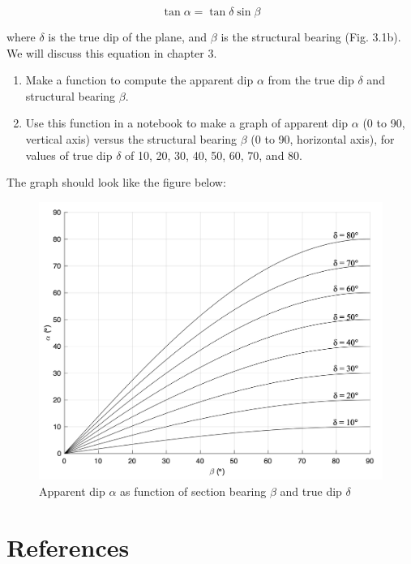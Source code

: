 \documentclass[a4paper , 12pt]{book}
\begin{document}
\begin{enumerate}
    \begin{equation}
        \tan\alpha=\tan\delta\sin\beta
    \end{equation}
    
    where $\delta$ is the true dip of the plane, and $\beta$ is the structural bearing (Fig. 3.1b). We will discuss this equation in chapter 3. 
    
    \begin {enumerate}
    \item Make a function to compute the apparent dip $\alpha$ from the true dip $\delta$ and structural bearing $\beta$. 
    \item Use this function in a notebook to make a graph of apparent dip $\alpha$ (0 to 90\degree, vertical axis) versus the structural bearing $\beta$ (0 to 90\degree, horizontal axis), for values of true dip $\delta$ of 10, 20, 30, 40, 50, 60, 70, and 80\degree. 
    \end{enumerate}
    
    The graph should look like the figure below:
    
    \begin{figure}[H]
        \centering
        \includegraphics[width=12cm]{Figures/ch1f3.png}
        \caption{Apparent dip $\alpha$ as function of section bearing $\beta$ and true dip $\delta$}
    \end{figure}
\end{enumerate}

\section*{References}
\end{document}
